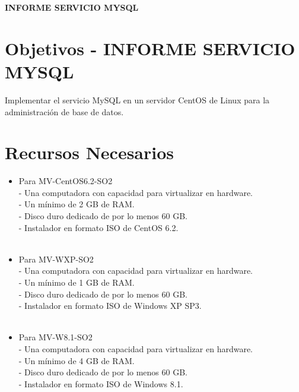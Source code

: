 
\begin{Large}
\begin{center}
\textbf{INFORME SERVICIO MYSQL} \\
\end{center}
\end{Large}

\section{Objetivos - INFORME SERVICIO MYSQL} 


\begin{itemize}

Implementar el servicio MySQL en un servidor CentOS de Linux para la administración de base de datos.\\

\end{itemize} 

\section{Recursos Necesarios} 

\begin{itemize}
\item Para MV-CentOS6.2-SO2
\\- Una computadora con capacidad para virtualizar en hardware.
\\-	Un mínimo de 2 GB de RAM.
\\-	Disco duro dedicado de por lo menos 60 GB.
\\-	Instalador en formato ISO de CentOS 6.2.
\\\
\end{itemize} 

\begin{itemize}
\item Para MV-WXP-SO2
\\- Una computadora con capacidad para virtualizar en hardware.
\\-	Un mínimo de 1 GB de RAM.
\\-	Disco duro dedicado de por lo menos 60 GB.
\\-	Instalador en formato ISO de Windows XP SP3.
\\\
\end{itemize} 

\begin{itemize}
\item Para MV-W8.1-SO2
\\- Una computadora con capacidad para virtualizar en hardware.
\\-	Un mínimo de 4 GB de RAM.
\\-	Disco duro dedicado de por lo menos 60 GB.
\\-	Instalador en formato ISO de Windows 8.1.
\\\
\end{itemize} 

